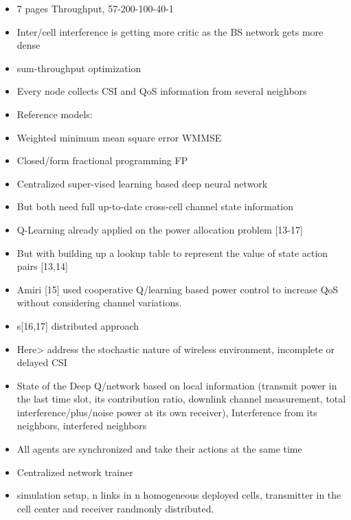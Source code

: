 \begin{itemize}

    \item 7 pages Throughput, 57-200-100-40-1
   \item  Inter/cell interference is getting more critic as the BS network gets more dense 
 \item sum-throughput optimization
    \item Every node collects CSI and QoS information from several neighbors 

    \item Reference models: 

    \item Weighted minimum mean square error WMMSE 

    \item Closed/form fractional programming FP 

    \item Centralized super-vised learning based deep neural network 

    \item But both need full up-to-date cross-cell channel state information 

    \item Q-Learning already applied on the power allocation problem [13-17] 

    \item But with building up a lookup table to represent the value of state action pairs [13,14] 

    \item Amiri [15] used cooperative Q/learning based power control to increase QoS without considering channel variations. 
    \item s[16,17] distributed approach 

    \item Here> address the stochastic nature of wireless environment, incomplete or delayed CSI 

    \item State of the Deep Q/network based on local information (transmit power in the last time slot, its contribution ratio, downlink channel measurement, total interference/plus/noise power at its own receiver), Interference from its neighbors, interfered neighbors 

    \item All agents are synchronized and take their actions at the same time 

    \item Centralized network trainer 
    \item simulation setup, n links in n homogeneous deployed cells, transmitter in the cell center and receiver randmonly distributed.
\end{itemize}
\fi
